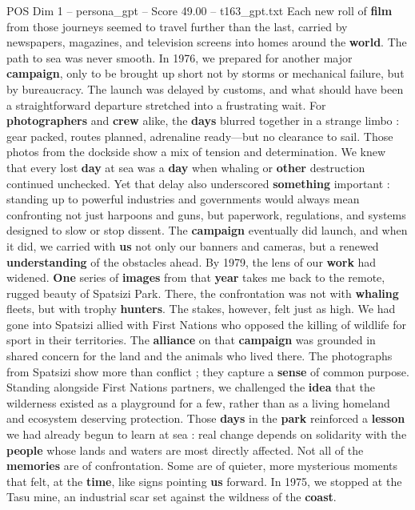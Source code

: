 \begin{textsample}{POS Dim 1 – persona\_gpt – Score 49.00 – t163\_gpt.txt}
Each new roll of \textbf{film} from those journeys seemed to travel further than the last, carried by newspapers, magazines, and television screens into homes around the \textbf{world}.
The path to sea was never smooth.
In 1976, we prepared for another major \textbf{campaign}, only to be brought up short not by storms or mechanical failure, but by bureaucracy.
The launch was delayed by customs, and what should have been a straightforward departure stretched into a frustrating wait.
For \textbf{photographers} and \textbf{crew} alike, the \textbf{days} blurred together in a strange limbo : gear packed, routes planned, adrenaline ready—but no clearance to sail.
Those photos from the dockside show a mix of tension and determination.
We knew that every lost \textbf{day} at sea was a \textbf{day} when whaling or \textbf{other} destruction continued unchecked.
Yet that delay also underscored \textbf{something} important : standing up to powerful industries and governments would always mean confronting not just harpoons and guns, but paperwork, regulations, and systems designed to slow or stop dissent.
The \textbf{campaign} eventually did launch, and when it did, we carried with \textbf{us} not only our banners and cameras, but a renewed \textbf{understanding} of the obstacles ahead.
By 1979, the lens of our \textbf{work} had widened. \textbf{One} series of \textbf{images} from that \textbf{year} takes me back to the remote, rugged beauty of Spatsizi Park.
There, the confrontation was not with \textbf{whaling} fleets, but with trophy \textbf{hunters}.
The stakes, however, felt just as high.
We had gone into Spatsizi allied with First Nations who opposed the killing of wildlife for sport in their territories.
The \textbf{alliance} on that \textbf{campaign} was grounded in shared concern for the land and the animals who lived there.
The photographs from Spatsizi show more than conflict ; they capture a \textbf{sense} of common purpose.
Standing alongside First Nations partners, we challenged the \textbf{idea} that the wilderness existed as a playground for a few, rather than as a living homeland and ecosystem deserving protection.
Those \textbf{days} in the \textbf{park} reinforced a \textbf{lesson} we had already begun to learn at sea : real change depends on solidarity with the \textbf{people} whose lands and waters are most directly affected.
Not all of the \textbf{memories} are of confrontation.
Some are of quieter, more mysterious moments that felt, at the \textbf{time}, like signs pointing \textbf{us} forward.
In 1975, we stopped at the Tasu mine, an industrial scar set against the wildness of the \textbf{coast}.

\end{textsample}
